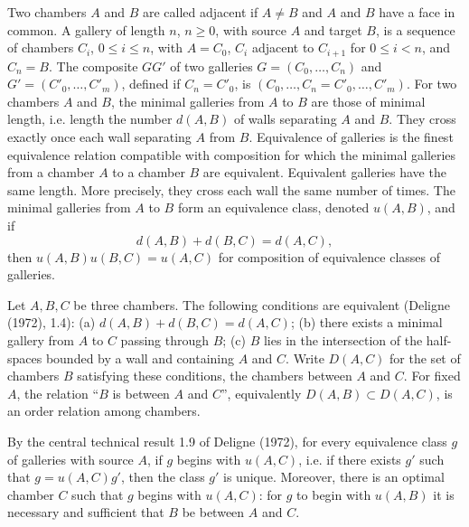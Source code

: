 \documentclass[11pt]{article}
\begin{document}
Two chambers $A$ and $B$ are called adjacent if $A\ne B$ and $A$ and $B$ have a face in common. A gallery of length $n$, $n\geq0$, with source $A$ and target $B$, is a sequence of chambers $C_i$, $0\leq i\leq n$, with $A=C_0$, $C_i$ adjacent to $C_{i+1}$ for $0\leq i<n$, and $C_n=B$. The composite $GG'$ of two galleries $G=(C_0,\ldots,C_n)$ and $G'=(C'_0,\ldots,C'_m)$, defined if $C_n=C'_0$, is $(C_0,\ldots,C_n=C'_0,\ldots,C'_m)$. For two chambers $A$ and $B$, the minimal galleries from $A$ to $B$ are those of minimal length, i.e. length the number $d(A,B)$ of walls separating $A$ and $B$. They cross exactly once each wall separating $A$ from $B$. Equivalence of galleries is the finest equivalence relation compatible with composition for which the minimal galleries from a chamber $A$ to a chamber $B$ are equivalent. Equivalent galleries have the same length. More precisely, they cross each wall the same number of times. The minimal galleries from $A$ to $B$ form an equivalence class, denoted $u(A,B)$, and if
\[
 d(A,B)+d(B,C)=d(A,C),
\]
then $u(A,B)u(B,C)=u(A,C)$ for composition of equivalence classes of galleries.

Let $A,B,C$ be three chambers. The following conditions are equivalent (Deligne (1972), 1.4): (a) $d(A,B)+d(B,C)=d(A,C)$; (b) there exists a minimal gallery from $A$ to $C$ passing through $B$; (c) $B$ lies in the intersection of the half-spaces bounded by a wall and containing $A$ and $C$. Write $D(A,C)$ for the set of chambers $B$ satisfying these conditions, the chambers between $A$ and $C$. For fixed $A$, the relation ``$B$ is between $A$ and $C$'', equivalently $D(A,B)\subset D(A,C)$, is an order relation among chambers.

By the central technical result 1.9 of Deligne (1972), for every equivalence class $g$ of galleries with source $A$, if $g$ begins with $u(A,C)$, i.e. if there exists $g'$ such that $g=u(A,C)g'$, then the class $g'$ is unique. Moreover, there is an optimal chamber $C$ such that $g$ begins with $u(A,C)$: for $g$ to begin with $u(A,B)$ it is necessary and sufficient that $B$ be between $A$ and $C$.
\end{document}
